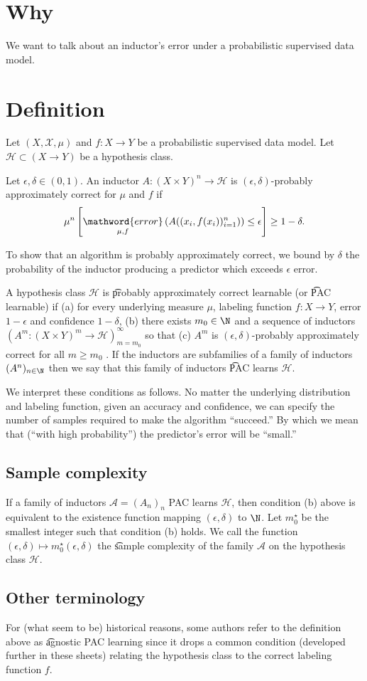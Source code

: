 
\section*{Why}

We want to talk about an inductor's error under a probabilistic supervised data model.

\section*{Definition}

Let $(X, \mathcal{X} , \mu )$ and $f: X \to Y$ be a probabilistic supervised data model.
Let $\mathcal{H}  \subset (X \to Y)$ be a hypothesis class.

Let $\epsilon ,\delta  \in (0, 1)$.
An inductor $A: (X \times  Y)^n \to \mathcal{H} $ is \t{$(\epsilon ,\delta )$-probably approximately correct} for $\mu $ and $f$ if
\[
\mu ^{n}\left[
\underset{\mu , f}{\mathword{error}}\left(
A((x_i, f(x_i))_{i = 1}^{n})
\right) \leq \epsilon
\right] \geq 1 - \delta .
\]

To show that an algorithm is probably approximately correct, we bound by $\delta $ the probability of the inductor producing a predictor which exceeds $\epsilon $ error.

A hypothesis class $\mathcal{H} $ is \t{probably approximately correct learnable} (or \t{PAC learnable}) if
(a) for every underlying measure $\mu $, labeling function $f: X \to Y$, error $1-\epsilon $ and confidence $1-\delta $, (b) there exists $m_0 \in \N  $ and a sequence of inductors $(A^m: (X \times Y)^{m} \to \mathcal{H} )_{m = m_0}^{\infty}$ so that (c) $A^m$ is $(\epsilon , \delta )$-probably approximately correct for all $m \geq m_0$ .
If the inductors are subfamilies of a family of inductors $(A^n)_{n \in \N  }$ then we say that this family of inductors \t{PAC learns} $\mathcal{H} $.

We interpret these conditions as follows.
No matter the underlying distribution and labeling function, given an accuracy and confidence, we can specify the number of samples required to make the algorithm ``succeed.''
By which we mean that (``with high probability'') the predictor's error will be ``small.''

\subsection*{Sample complexity}

If a family of inductors $\mathcal{A}  = (A_n)_n$ PAC learns $\mathcal{H} $, then condition (b) above is equivalent to the existence function mapping $(\epsilon , \delta )$ to $\N  $.
Let $m_0^\star$ be the smallest integer such that condition (b) holds.
We call the function $(\epsilon , \delta ) \mapsto m_0^\star(\epsilon ,\delta )$ the \t{sample complexity} of the family $\mathcal{A} $ on the hypothesis class $\mathcal{H} $.

\subsection*{Other terminology}

For (what seem to be) historical reasons, some authors refer to the definition above as \t{agnostic PAC learning} since it drops a common condition (developed further in these sheets) relating the hypothesis class to the correct labeling function $f$.

\blankpage